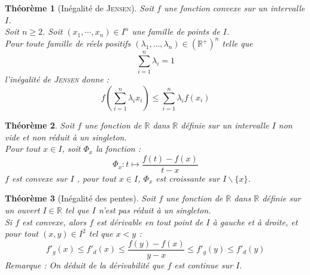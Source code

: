 \documentclass[11pt,a4paper]{report}
\newtheorem{theorem}{Théorème}[chapter]
\newtheorem{itheorem}[theorem]{Théorème}
\theoremstyle{definition}
\begin{document}
\begin{itheorem}[Inégalité de \textsc{Jensen}]
     Soit $f$ une fonction \emph{convexe} sur un intervalle $I$. \\
     Soit $n\ge 2$. Soit $(x_1,\cdots ,x_n) \in I^n$ une famille de points de $I$. \\
     Pour toute famille de \emph{réels positifs} $(\lambda_1,\ldots ,\lambda_n)\in {\left( \ensuremath{\mathbb{R}}^+ \right) }^n$ telle que \[
         \sum_{i=1}^n \lambda_i = 1
     \]
     l'\emph{inégalité de \textsc{Jensen}} donne :
     \begin{equation}
     f \left( \sum_{i=1}^n \lambda_i x_i \right) \le \sum_{i=1}^n \lambda_i f(x_i)
     \end{equation}
\end{itheorem}
\begin{theorem}
     Soit $f$ une fonction de $\ensuremath{\mathbb{R}}$ dans $\ensuremath{\mathbb{R}}$ définie sur un intervalle $I$ non vide et non réduit à un singleton.\\
     Pour tout $x\in I$, soit $\Phi_x$ la fonction :
     \begin{equation}
      \Phi_x : t\mapsto \dfrac{f(t) - f(x)}{t-x}
     \end{equation} 
     $f$ est convexe sur $I$ \Longleftrightarrow, pour tout $x\in I$, $\Phi_x$ est croissante sur $I\backslash \{x\}$.
\end{theorem}
\begin{itheorem}[Inégalité des pentes]
\label{thm:inegalite_des_pentes}
     Soit $f$ une fonction de $\ensuremath{\mathbb{R}}$ dans $\ensuremath{\mathbb{R}}$ définie sur un \emph{ouvert} $I\in \ensuremath{\mathbb{R}}$ tel que $I$ n'est pas réduit à un singleton. \\
     Si $f$ est convexe, alors $f$ est dérivable en tout point de $I$ à gauche et à droite, et pour tout $(x,y) \in I^2$ tel que $x<y$ :
     \begin{equation}
     f'_g(x) \le f'_d(x) \le \dfrac{f(y) - f(x)}{y - x} \le f'_g(y) \le f'_d(y)
     \end{equation}
     \emph{Remarque :} On déduit de la dérivabilité que $f$ est continue sur $I$.
\end{itheorem}
\end{document}
